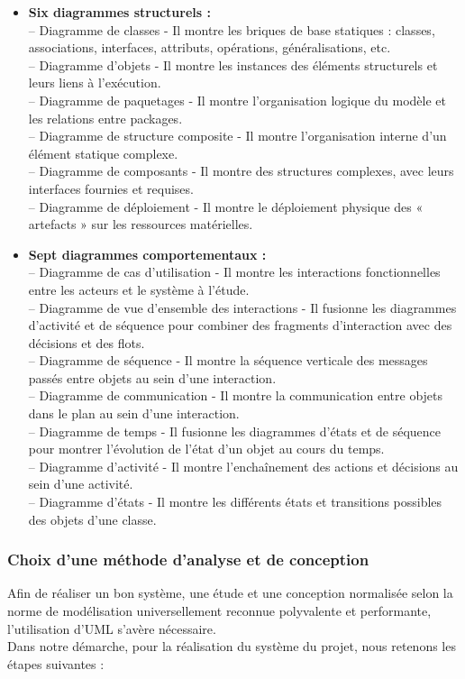 \documentclass[a4paper, 12pt]{report}
\begin{document}
 \begin{itemize}
    \item \textbf{Six diagrammes structurels :}\\
    -- Diagramme de classes - Il montre les briques de base statiques : classes,
associations, interfaces, attributs, opérations, généralisations, etc.\\
    --  Diagramme d’objets - Il montre les instances des éléments structurels et
leurs liens à l’exécution.\\
    -- Diagramme de paquetages - Il montre l’organisation logique du modèle
et les relations entre packages.\\
   -- Diagramme de structure composite - Il montre l’organisation interne
d’un élément statique complexe.\\
    -- Diagramme de composants - Il montre des structures complexes, avec
leurs interfaces fournies et requises.\\
    -- Diagramme de déploiement - Il montre le déploiement physique des «
artefacts » sur les ressources matérielles.
    \item \textbf{Sept diagrammes comportementaux :}\\
    -- Diagramme de cas d’utilisation - Il montre les interactions fonctionnelles
entre les acteurs et le système à l’étude.\\
    -- Diagramme de vue d’ensemble des interactions - Il fusionne les
diagrammes d’activité et de séquence pour combiner des fragments
d’interaction avec des décisions et des flots.\\
    -- Diagramme de séquence - Il montre la séquence verticale des messages
passés entre objets au sein d’une interaction.\\
    -- Diagramme de communication - Il montre la communication entre objets
dans le plan au sein d’une interaction.\\
    -- Diagramme de temps - Il fusionne les diagrammes d’états et de séquence
pour montrer l’évolution de l’état d’un objet au cours du temps.\\
    -- Diagramme d’activité - Il montre l’enchaînement des actions et décisions
au sein d’une activité.\\
    -- Diagramme d’états - Il montre les différents états et transitions possibles
des objets d’une classe.
\end{itemize}

\subsubsection{Choix d'une méthode  d'analyse et de conception}
Afin de réaliser un bon système, une étude et une conception normalisée selon la norme de
modélisation universellement reconnue polyvalente et performante,\\ l’utilisation d’UML
s’avère nécessaire.\\
Dans notre démarche, pour la réalisation du système du projet, nous retenons les étapes
suivantes :
\end{document}
